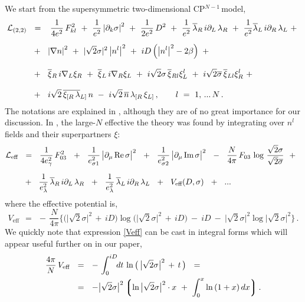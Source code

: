 \documentclass[epsfig,12pt]{article}
\def\beq{\begin{equation}}
\def\eeq{\end{equation}}
\newcommand{\p}{\partial}
\newcommand{\ov}{\overline}
\newcommand{\mc}[1]{\mathcal{#1}}
\newcommand{\lgr}{\left\lgroup}
\newcommand{\rgr}{\right\rgroup}
\newcommand{\bxir}{\ov{\xi}{}_R}
\newcommand{\bxil}{\ov{\xi}{}_L}
\newcommand{\xir}{\xi_R}
\newcommand{\xil}{\xi_L}
\newcommand{\nbar}{\ov{n}}
\newcommand{\cpn}{CP$^{N-1}$\,}
\newcommand{\lar}{\lambda_R}
\newcommand{\lal}{\lambda_L}
\newcommand{\blar}{\ov{\lambda}{}_R}
\newcommand{\blal}{\ov{\lambda}{}_L}
\begin{document}
	We start from the supersymmetric two-dimensional \cpn model,
\begin{align}
\label{sigma22}
% 
\notag
 	\mc{L}_\text{(2,2)} & ~~=~~
	\,\frac{1}{4e^2}\,F_{kl}^2  ~+~ \frac{1}{e^2} \left|\p_k \sigma\right|^2 
	~+~ \frac{1}{2e^2}\, D^2
	~+~ \frac{1}{e^2}\, \blar\, i\p_L\, \lar  ~+~  \frac{1}{e^2} \blal\, i\p_R\, \lal
	~+~
	\\[2mm]
%
	&
	~~+~~
	\left| \nabla n \right|^2  ~+~ | \sqrt{2}\sigma |^2 \left| n^l \right|^2
	~+~ iD \left( \left|n^l \right|^2 - 2\beta \right)
	~+~
	\\[2.8mm]
%
\notag	&
	~~+~~ \bxir\, i\nabla_L \xir  ~+~ \bxil\, i\nabla_R \xil ~+~
	i\sqrt{2}\sigma\, \ov{\xi}{}_{Rl} \xi_L^l
	~+~ i\sqrt{2}\ov{\sigma}\, \ov{\xi}{}_{Ll} \xi_R^l
	~+~
	\\[2.8mm]
%
\notag
	&
	~~+~~ i\sqrt{2}\, \ov{\xi_{[R}\, \lambda}{}_{L]}\, n
	~-~ i\sqrt{2}\, \nbar\,  \lambda_{[R}\, \xi_{L]}\,,
	\qquad
	l  ~=~  1,\,...\,N\,.
\end{align}
	The notations are explained in \cite{BSY3}, although they are of no great importance
	for our discussion. 
	In \cite{SYhet}, the large-$ N $ effective the theory was found
	by integrating over $ n^l $ fields and their superpartners $ \xi $:
\begin{align}
%
\notag
	\mc{L}_\text{eff}	& ~~=~~
                \frac{1}{4e_\gamma^2}\,F_{03}^2
		~~+~~ \frac{1}{e_{\sigma 1}^2}\,\big|\p_\mu\,\text{Re}\,\sigma\big|^2
		~~+~~ \frac{1}{e_{\sigma 2}^2}\,\big|\p_\mu\,\text{Im}\,\sigma\big|^2
		~~-~~ \frac{N}{4\pi}\,F_{03}\,\log\, \frac{\sqrt{2}\sigma}{\sqrt{2}\ov\sigma}
		~~+~~
	\\[2mm]
%
\label{Leff}
	&
                ~~+~~ \frac{1}{e_\lambda^2}\,\ov{\lambda}{}_R\, i\p_L\, \lambda_R
                ~~+~~ \frac{1}{e_\lambda^2}\,\ov{\lambda}{}_L\, i\p_R\, \lambda_L
                ~~+~~ V_\text{eff}(D, \sigma)
                ~~+~~ ...
\end{align}
	where the effective potential is,
\beq
\label{Veff}
	V_\text{eff}    ~~=~~    -\, \frac{N}{4\pi} 
	\bigg\{
		\big( \big|\sqrt{2}\sigma\big|^2 \,+\, iD \big) 
		\log \big( \big|\sqrt{2}\sigma\big|^2 \,+\, iD \big)
		~-~
		iD
		~-~
		\big|\sqrt{2}\sigma\big|^2 \log \big|\sqrt{2}\sigma\big|^2
	\bigg\}\,.
\eeq
	We quickly note that expression \eqref{Veff} can be cast
	in integral forms which will appear useful further on in our paper,
\begin{align}
%
\notag
	\frac{4\pi}{N}\, V_\text{eff} &    ~~=~~    -\, \int_0^{iD} \!\!dt\, \ln \big(\, \big|\sqrt{2}\sigma\big|^2 \,+\, t \,\big)
	~~=
	\\
%
\label{Vint}
	&
	~~=~~    - \big|\sqrt{2}\sigma\big|^2 \lgr \ln \big|\sqrt{2}\sigma\big|^2 \cdot x ~+~
						\int_0^x \ln\, (1 + x)\, dx \rgr.
\end{align}
\end{document}
